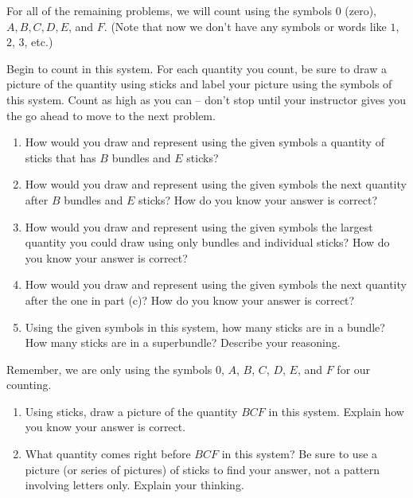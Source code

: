 \documentclass[nooutcomes,noauthor,handout]{ximera}
\begin{document}
\newpage

For all of the remaining problems, we will count using the symbols $0$ (zero), $A, B, C, D, E$, and $F$. (Note that now we don't have any symbols or words like $1$, $2$, $3$, etc.)

\begin{problem}

Begin to count in this system. For each quantity you count, be sure to draw a picture of the quantity using sticks and label your picture using the symbols of this system. Count as high as you can -- don't stop until your instructor gives you the go ahead to move to the next problem. 

\end{problem}


\begin{problem}
\begin{enumerate}
	\item How would you draw and represent using the given symbols a quantity of sticks that has $B$ bundles and $E$ sticks?
	\item How would you draw and represent using the given symbols the next quantity after $B$ bundles and $E$ sticks? How do you know your answer is correct?
	\item How would you draw and represent using the given symbols the largest quantity you could draw using only bundles and individual sticks? How do you know your answer is correct?
	\item How would you draw and represent using the given symbols the next quantity after the one in part (c)? How do you know your answer is correct?
	\item Using the given symbols in this system, how many sticks are in a bundle? How many sticks are in a superbundle? Describe your reasoning. 
\end{enumerate}
\end{problem}

\newpage

Remember, we are only using the symbols $0$, $A$, $B$, $C$, $D$, $E$, and $F$ for our counting.

\begin{problem}
\begin{enumerate}
	\item Using sticks, draw a picture of the quantity $BCF$ in this system. Explain how you know your answer is correct.
	\item What quantity comes right before $BCF$ in this system? Be sure to use a picture (or series of pictures) of sticks to find your answer, not a pattern involving letters only. Explain your thinking.
\end{enumerate}
\end{problem}
\end{document}

